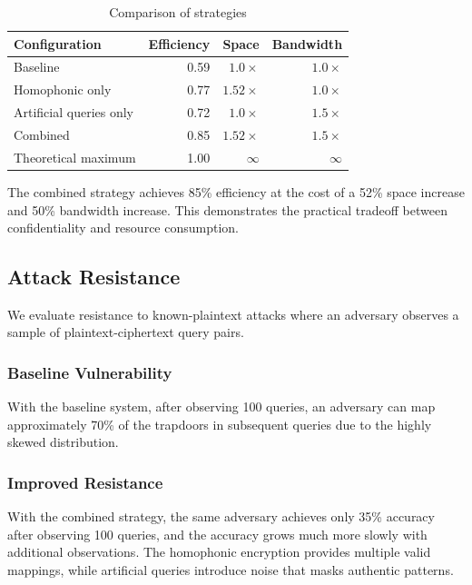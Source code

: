 \documentclass[final,11pt]{article}
\numberwithin{equation}{section}
\theoremstyle{plain}
\theoremstyle{remark}
\begin{document}
\begin{table}[h]
    \centering
    \caption{Comparison of strategies}
    \label{tbl:strategy_comparison}
    \begin{tabular}{@{} l r r r @{}}
        \toprule
        \textbf{Configuration} & \textbf{Efficiency} & \textbf{Space} & \textbf{Bandwidth}\\
        \midrule
        Baseline & 0.59 & $1.0\times$ & $1.0\times$\\
        Homophonic only & 0.77 & $1.52\times$ & $1.0\times$\\
        Artificial queries only & 0.72 & $1.0\times$ & $1.5\times$\\
        Combined & 0.85 & $1.52\times$ & $1.5\times$\\
        \midrule
        Theoretical maximum & 1.00 & $\infty$ & $\infty$\\
        \bottomrule
    \end{tabular}
\end{table}

The combined strategy achieves 85\% efficiency at the cost of a 52\% space increase and 50\% bandwidth increase. This demonstrates the practical tradeoff between confidentiality and resource consumption.

\subsection{Attack Resistance}
We evaluate resistance to known-plaintext attacks where an adversary observes a sample of plaintext-ciphertext query pairs.

\subsubsection{Baseline Vulnerability}
With the baseline system, after observing 100 queries, an adversary can map approximately 70\% of the trapdoors in subsequent queries due to the highly skewed distribution.

\subsubsection{Improved Resistance}
With the combined strategy, the same adversary achieves only 35\% accuracy after observing 100 queries, and the accuracy grows much more slowly with additional observations. The homophonic encryption provides multiple valid mappings, while artificial queries introduce noise that masks authentic patterns.
\end{document}
